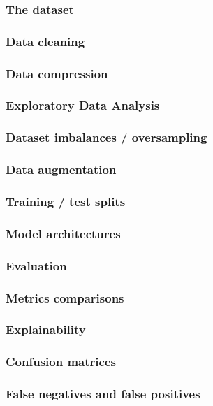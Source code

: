 \begin{frame}
    \frametitle{The dataset}
\end{frame}

\begin{frame}
    \frametitle{Data cleaning}
\end{frame}

\begin{frame}
    \frametitle{Data compression}
\end{frame}

\begin{frame}
    \frametitle{Exploratory Data Analysis}
\end{frame}

\begin{frame}
    \frametitle{Dataset imbalances / oversampling}
\end{frame}

\begin{frame}
    \frametitle{Data augmentation}
\end{frame}

\begin{frame}
    \frametitle{Training / test splits}
\end{frame}

\begin{frame}
    \frametitle{Model architectures}
\end{frame}

\begin{frame}
    \frametitle{Evaluation}
\end{frame}

\begin{frame}
    \frametitle{Metrics comparisons}
\end{frame}

\begin{frame}
    \frametitle{Explainability}
\end{frame}

\begin{frame}
    \frametitle{Confusion matrices}
\end{frame}

\begin{frame}
    \frametitle{False negatives and false positives}
\end{frame}